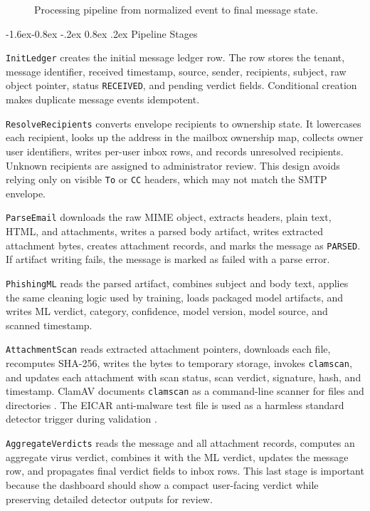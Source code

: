 \documentclass[12pt,a4paper]{article}
\makeatletter
\renewcommand\subsection{\@startsection{subsection}{2}{\z@}%
  {-1.6ex\@plus -0.8ex \@minus -.2ex}%
  {0.8ex \@plus .2ex}%
  {\normalfont\normalsize\bfseries}}
\makeatother
\begin{document}
\begin{figure}[!htbp]
\centering
\resizebox{\textwidth}{!}{}
\caption{Processing pipeline from normalized event to final message state.}
\label{fig:pipeline}
\end{figure}

\subsection{Pipeline Stages}

\texttt{InitLedger} creates the initial message ledger row. The row stores the tenant, message identifier, received timestamp, source, sender, recipients, subject, raw object pointer, status \texttt{RECEIVED}, and pending verdict fields. Conditional creation makes duplicate message events idempotent.

\texttt{ResolveRecipients} converts envelope recipients to ownership state. It lowercases each recipient, looks up the address in the mailbox ownership map, collects owner user identifiers, writes per-user inbox rows, and records unresolved recipients. Unknown recipients are assigned to administrator review. This design avoids relying only on visible \texttt{To} or \texttt{CC} headers, which may not match the SMTP envelope.

\texttt{ParseEmail} downloads the raw MIME object, extracts headers, plain text, HTML, and attachments, writes a parsed body artifact, writes extracted attachment bytes, creates attachment records, and marks the message as \texttt{PARSED}. If artifact writing fails, the message is marked as failed with a parse error.

\texttt{PhishingML} reads the parsed artifact, combines subject and body text, applies the same cleaning logic used by training, loads packaged model artifacts, and writes ML verdict, category, confidence, model version, model source, and scanned timestamp.

\texttt{AttachmentScan} reads extracted attachment pointers, downloads each file, recomputes SHA-256, writes the bytes to temporary storage, invokes \texttt{clamscan}, and updates each attachment with scan status, scan verdict, signature, hash, and timestamp. ClamAV documents \texttt{clamscan} as a command-line scanner for files and directories \cite{clamav_scanning}. The EICAR anti-malware test file is used as a harmless standard detector trigger during validation \cite{eicar_test_file}.

\texttt{AggregateVerdicts} reads the message and all attachment records, computes an aggregate virus verdict, combines it with the ML verdict, updates the message row, and propagates final verdict fields to inbox rows. This last stage is important because the dashboard should show a compact user-facing verdict while preserving detailed detector outputs for review.
\end{document}
